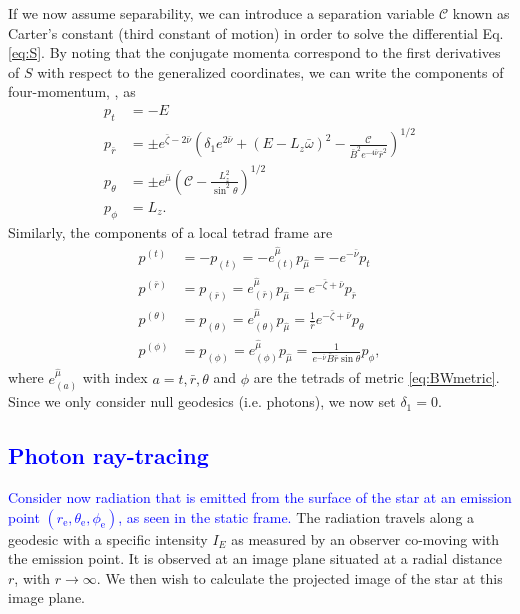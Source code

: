 \documentclass{aa}
\makeatletter
\def\fvec#1{\underline{\sbox\tw@{$#1$}\dp\tw@\z@\box\tw@}}
\newcommand{\refe}[1]{\textcolor{blue}{{#1}}}
\newcommand{\Ca}{\ensuremath{\mathcal{C}}}
\newcommand{\rb}{\ensuremath{\bar{r}}}
\newcommand{\wb}{\ensuremath{\bar{\omega}}}
\newcommand{\nub}{\ensuremath{\bar{\nu}}}
\newcommand{\zetab}{\ensuremath{\bar{\zeta}}}
\newcommand{\Bb}{\ensuremath{\bar{B}}}
\newcommand{\mub}{\ensuremath{\bar{\mu}}}
\makeatother
\begin{document}
If we now assume separability, we can introduce a separation variable $\Ca$ known as Carter's constant (third constant of motion) in order to solve the differential Eq. \eqref{eq:S}.  
By noting that the conjugate momenta correspond to the first derivatives of $S$ with respect to the generalized coordinates, we can write the components of four-momentum, \fvec{p}, as 
\begin{align}
  p_t        &= -E \label{eq:p_t}\\
  p_{\rb}    &= \pm e^{\zetab - 2\nub} \left( \delta_1 e^{2\nub} + (E - L_z \wb)^2 - \frac{\Ca}{\Bb^2 e^{-4\nub} \rb^2} \right)^{1/2}\label{eq:p_r}\\
  p_{\theta} &= \pm e^{\mub} \left( \Ca - \frac{L_z^2}{\sin^2\theta} \right)^{1/2}\label{eq:p_the}\\
  p_{\phi}   &= L_z\label{eq:p_p}.
\end{align}
Similarly, the components of a local tetrad frame are
\begin{align}
  p^{(t)} &= -p_{(t)} = -e_{(t)}^{\hat{\mu}} p_{\hat{\mu}} = -e^{-\nub}p_t \label{eq:tetp_t}\\
  p^{(\rb)} &= p_{(\rb)} = e_{(\rb)}^{\hat{\mu}} p_{\hat{\mu}} = e^{-\zetab + \nub} p_{\rb} \label{eq:tetp_r}\\
  p^{(\theta)} &= p_{(\theta)} = e_{(\theta)}^{\hat{\mu}} p_{\hat{\mu}} = \frac{1}{\rb} e^{-\zetab+\nub} p_{\theta} \label{eq:tetp_theta}\\
  p^{(\phi)} &= p_{(\phi)} = e_{(\phi)}^{\hat{\mu}} p_{\hat{\mu}} = \frac{1}{e^{-\nub} \Bb \rb \sin\theta} p_{\phi} \label{eq:tetp_phi},
\end{align}
where $e^{\hat{\mu}}_{(a)}$ with index $a = t, \rb, \theta$ and $\phi$ are the tetrads of metric \eqref{eq:BWmetric}.
Since we only consider null geodesics (i.e. photons), we now set $\delta_1 = 0$.

\subsection{\refe{Photon ray-tracing}}\label{sect:raytracing}
\refe{Consider now radiation that is emitted from the surface of the star at an emission point $(r_{\mathrm{e}},\theta_{\mathrm{e}},\phi_{\mathrm{e}})$, as seen in the static frame.}
The radiation travels along a geodesic with a specific intensity $I_{E}$ as measured by an observer co-moving with the emission point.  
It is observed at an image plane situated at a radial distance $r$, with $r\rightarrow\infty$.  
We then wish to calculate the projected image of the star at this image plane.
\end{document}
